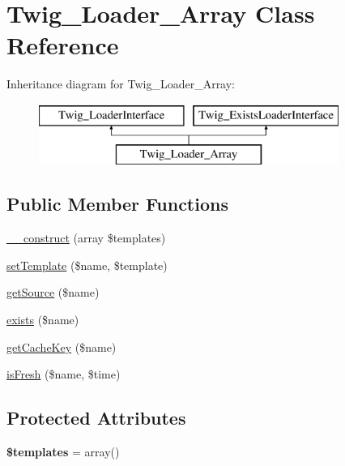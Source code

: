 \hypertarget{class_twig___loader___array}{}\section{Twig\+\_\+\+Loader\+\_\+\+Array Class Reference}
\label{class_twig___loader___array}
Inheritance diagram for Twig\+\_\+\+Loader\+\_\+\+Array\+:\begin{figure}[H]
\begin{center}
\leavevmode
\includegraphics[height=2.000000cm]{class_twig___loader___array}
\end{center}
\end{figure}
\subsection*{Public Member Functions}
\begin{DoxyCompactItemize}
\item 
\hyperlink{class_twig___loader___array_a3f09285538f6055294690bfb6110b3e9}{\+\_\+\+\_\+construct} (array \$templates)
\item 
\hyperlink{class_twig___loader___array_aac414f998f58d0487c0ccec6a5af5ecb}{set\+Template} (\$name, \$template)
\item 
\hyperlink{class_twig___loader___array_a8c6017d8ed0800a8d6b201883fcfb4bd}{get\+Source} (\$name)
\item 
\hyperlink{class_twig___loader___array_a0909de156d39accf2e3c52f4bce3765f}{exists} (\$name)
\item 
\hyperlink{class_twig___loader___array_aaf1587bcc7c8f06e87be6ccaf76fb6ea}{get\+Cache\+Key} (\$name)
\item 
\hyperlink{class_twig___loader___array_a3ee0419b212dc4f6f1e8a5a615423ad8}{is\+Fresh} (\$name, \$time)
\end{DoxyCompactItemize}
\subsection*{Protected Attributes}
\begin{DoxyCompactItemize}
\item 
\hypertarget{class_twig___loader___array_a3326a7f5703016042df69801c9770b4c}{}{\bfseries \$templates} = array()\label{class_twig___loader___array_a3326a7f5703016042df69801c9770b4c}

\end{DoxyCompactItemize}


